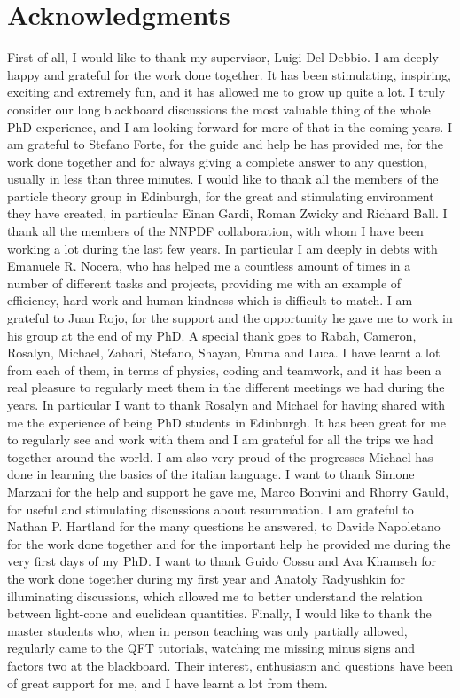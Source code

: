 \chapter*{Acknowledgments}
%
First of all, I would like to thank my supervisor, Luigi Del Debbio.
I am deeply happy and grateful for the work done together.
It has been stimulating, inspiring, exciting and extremely fun, and it has allowed me to grow up
quite a lot.
I truly consider our long blackboard discussions the most valuable thing of the whole PhD experience, and
I am looking forward for more of that in the coming years.
%
I am grateful to Stefano Forte, for the guide and help he has provided me, for the work done together 
and for always giving a complete answer to any question, usually in less than three minutes.
I would like to thank all the members of the particle theory group in Edinburgh, for the 
great and stimulating environment they have created, in particular Einan Gardi, Roman Zwicky and Richard Ball. 
%
I thank all the members of the NNPDF collaboration, with whom I have been working a lot during the last
few years. In particular I am deeply in debts with Emanuele R. Nocera, who has helped me a countless amount of 
times in a number of different tasks and projects, providing me with an example of efficiency, hard work and human kindness which
is difficult to match. I am grateful to Juan Rojo, for the support and the opportunity he gave me to work in his group
at the end of my PhD.
%
A special thank goes to Rabah, Cameron, Rosalyn, Michael, Zahari, Stefano, Shayan, Emma
and Luca. I have learnt a lot from each of them, in terms of physics, coding and teamwork, and it has been a real pleasure
to regularly meet them in the different meetings we had during the years.
In particular I want to thank Rosalyn and Michael for having shared with me the experience of being PhD students in Edinburgh.
It has been great for me to regularly see and work with them and I am grateful for all the trips
we had together around the world. 
I am also very proud of the progresses Michael has done in learning the basics of the italian language.
%
I want to thank Simone Marzani for the help and support he gave me, Marco Bonvini and Rhorry Gauld, for 
useful and stimulating discussions about resummation.  
%
I am grateful to Nathan P. Hartland for the many questions he answered, to
Davide Napoletano for the work done together and for the important help he provided me during the very first days of my PhD.
I want to thank Guido Cossu and Ava Khamseh for the work done together during my first year
and Anatoly Radyushkin for illuminating discussions, which allowed me to better understand the relation 
between light-cone and euclidean quantities. Finally, I would like to thank the master students who, when 
in person teaching was only partially allowed, regularly came to the QFT tutorials, watching me missing
minus signs and factors two at the blackboard.
Their interest, enthusiasm and questions have been of great support for me, and I have learnt a lot from them. 

